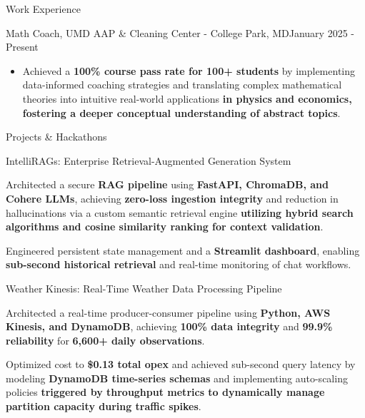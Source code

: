 \documentclass{resume} %
\begin{document}
\begin{rSection}{Work Experience}
\begin{rSubsection}
{Math Coach, UMD AAP \& Cleaning Center - College Park, MD}{January 2025 - Present}{}{}
\begin{itemize}[left=-1.5em, labelsep=.1cm, labelwidth=.2cm, itemsep=0.0em]
\item Achieved a \textbf{100\% course pass rate for 100+ students} by implementing data-informed coaching strategies and translating complex mathematical theories into intuitive real-world applications \textbf{in physics and economics, fostering a deeper conceptual understanding of abstract topics}.
\end{itemize}
\end{rSubsection}

\end{rSection}

\begin{rSection}{Projects \& Hackathons \vspace{.1em}}

\begin{rSubsection}{IntelliRAGs: Enterprise Retrieval-Augmented Generation System}{}{}{}
\begin{itemize}[left=-1.5em, labelsep=.1cm, labelwidth=.2cm, itemsep=0.0em]
{\item Architected a secure \textbf{RAG pipeline} using \textbf{FastAPI, ChromaDB, and Cohere LLMs}, achieving \textbf{zero-loss ingestion integrity} and reduction in hallucinations via a custom semantic retrieval engine \textbf{utilizing hybrid search algorithms and cosine similarity ranking for context validation}.}
{\item Engineered persistent state management and a \textbf{Streamlit dashboard}, enabling \textbf{sub-second historical retrieval} and real-time monitoring of chat workflows.}
\end{itemize}
\end{rSubsection}

\begin{rSubsection}{Weather Kinesis: Real-Time Weather Data Processing Pipeline}{}{}{}
\begin{itemize}[left=-1.5em, labelsep=.1cm, labelwidth=.2cm, itemsep=0.0em]
{\item Architected a real-time producer-consumer pipeline using \textbf{Python, AWS Kinesis, and DynamoDB}, achieving \textbf{100\% data integrity} and \textbf{99.9\% reliability} for \textbf{6,600+ daily observations}.}
{\item Optimized cost to \textbf{\$0.13 total opex} and achieved sub-second query latency by modeling \textbf{DynamoDB time-series schemas} and implementing auto-scaling policies \textbf{triggered by throughput metrics to dynamically manage partition capacity during traffic spikes}.}
\end{itemize}
\end{rSubsection}


\end{rSection}
\end{document}
